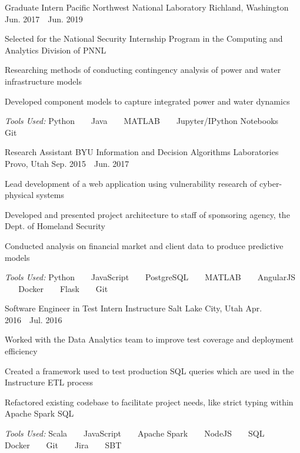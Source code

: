 \begin{cventries}
  \cventry
    {Graduate Intern} %
    {Pacific Northwest National Laboratory} %
    {Richland, Washington} %
    {Jun. 2017~\textendash~Jun. 2019} %
    {
      \begin{cvitems} %
        \item {Selected for the National Security Internship Program in the Computing and Analytics Division of PNNL}
        \item {Researching methods of conducting contingency analysis of power and water infrastructure models}
        \item {Developed component models to capture integrated power and water dynamics}
      \end{cvitems}
    }
    {
      \emph{Tools Used:} Python ~ \bullet ~ Java ~ \bullet ~ MATLAB ~ \bullet ~ Jupyter/IPython Notebooks ~ \bullet ~ Git
    }
    
  \cventry
    {Research Assistant} %
    {BYU Information and Decision Algorithms Laboratories} %
    {Provo, Utah} %
    {Sep. 2015~\textendash~Jun. 2017} %
    {
      \begin{cvitems} %
        \item {Lead development of a web application using vulnerability research of cyber-physical systems}
        \item {Developed and presented project architecture to staff of sponsoring agency, the Dept. of Homeland Security}
        \item {Conducted analysis on financial market and client data to produce predictive models}
      \end{cvitems}
    }
    {
      \emph{Tools Used:} Python ~ \bullet ~ JavaScript ~ \bullet ~ PostgreSQL ~ \bullet ~ MATLAB ~ \bullet ~ AngularJS ~ \bullet ~ Docker ~ \bullet ~ Flask ~ \bullet ~ Git
    }

  \cventry
    {Software Engineer in Test Intern} %
    {Instructure} %
    {Salt Lake City, Utah} %
    {Apr. 2016~\textendash~Jul. 2016} %
    {
      \begin{cvitems} %
        \item {Worked with the Data Analytics team to improve test coverage and deployment efficiency}
        \item {Created a framework used to test production SQL queries which are used in the Instructure ETL process}
        \item {Refactored existing codebase to facilitate project needs, like strict typing within Apache Spark SQL}
      \end{cvitems}
    }
    {
      \emph{Tools Used:} Scala ~ \bullet ~ JavaScript ~ \bullet ~ Apache Spark ~ \bullet ~ NodeJS ~ \bullet ~ SQL ~ \bullet ~ Docker ~ \bullet ~ Git ~ \bullet ~ Jira  ~ \bullet ~ SBT
    }


\end{cventries}
